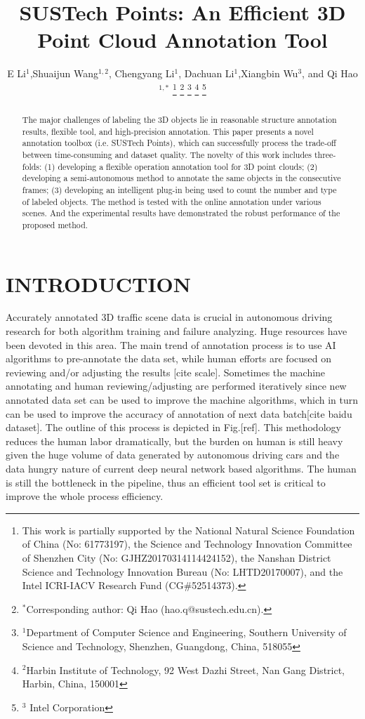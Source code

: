 \documentclass[letterpaper, 10 pt, conference]{ieeeconf}  %
\title{\LARGE \bf
SUSTech Points: An Efficient 3D Point Cloud Annotation Tool
}
\author{E Li$^{1}$,Shuaijun Wang$^{1,2}$,  Chengyang Li$^{1}$, Dachuan Li$^{1}$,Xiangbin Wu$^{3}$, and Qi Hao$^{1,*}$%
\thanks{This work is partially supported by the National Natural Science Foundation of China (No: 61773197), the Science and Technology Innovation Committee of Shenzhen City (No: GJHZ20170314114424152), the Nanshan District Science and Technology Innovation Bureau (No: LHTD20170007), and the Intel ICRI-IACV Research Fund (CG$\#$52514373).}
\thanks{$^{*}$Corresponding author: Qi Hao (hao.q@sustech.edu.cn).}
\thanks{$^{1}$Department of Computer Science and Engineering,
Southern University of Science and Technology, Shenzhen, Guangdong, China, 518055}
\thanks{$^{2}$Harbin Institute of Technology,
92 West Dazhi Street, Nan Gang District, Harbin, China, 150001}%
\thanks{$^{3}$ Intel Corporation}%
}
\begin{document}
\maketitle
\thispagestyle{empty}
\pagestyle{empty}
\begin{abstract}
The major challenges of labeling the 3D objects lie in reasonable structure annotation results, flexible tool, and high-precision annotation. This paper presents a novel annotation toolbox (i.e. SUSTech Points), which can successfully process the trade-off between time-consuming and dataset quality. The novelty of this work includes three-folds: (1) developing a flexible operation annotation tool for 3D point clouds; (2) developing a semi-autonomous method to annotate the same objects in the consecutive frames; (3) developing an intelligent plug-in being used to count the number and type of labeled objects. The method is tested with the online annotation under various scenes. And the experimental results have demonstrated the robust performance of the proposed method.
\end{abstract}






\section{INTRODUCTION}

Accurately annotated 3D traffic scene data  is  crucial in autonomous driving research for both algorithm training and failure analyzing. Huge resources have been devoted in this area. 
The main trend of annotation process is to use AI algorithms to pre-annotate the data set, while human efforts are focused on reviewing and/or adjusting the results [cite scale]. 
Sometimes the machine annotating and human reviewing/adjusting are performed iteratively since new annotated data set can be used to improve the machine algorithms, which in turn can be used to improve the accuracy of annotation of next data batch[cite baidu dataset]. The outline of this process is depicted in Fig.[ref].   
This methodology reduces the human labor dramatically, but the burden on human is still heavy given the huge volume of data generated by autonomous driving cars and the data hungry nature of current deep neural network based algorithms. The human is still the bottleneck in the pipeline, thus an efficient tool set is critical to improve the whole process efficiency.
\end{document}
